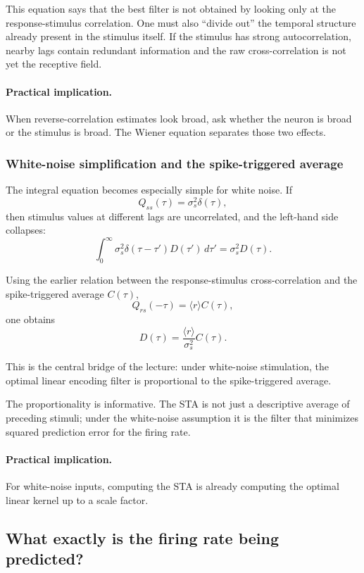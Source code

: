 This equation says that the best filter is not obtained by looking only at the response-stimulus correlation. One must also ``divide out'' the temporal structure already present in the stimulus itself. If the stimulus has strong autocorrelation, nearby lags contain redundant information and the raw cross-correlation is not yet the receptive field.

\paragraph{Practical implication.}
When reverse-correlation estimates look broad, ask whether the neuron is broad or the stimulus is broad. The Wiener equation separates those two effects.

\subsubsection{White-noise simplification and the spike-triggered average}

The integral equation becomes especially simple for white noise. If
\[
Q_{ss}(\tau)=\sigma_s^2\delta(\tau),
\]
then stimulus values at different lags are uncorrelated, and the left-hand side collapses:
\[
\int_0^{\infty} \sigma_s^2\delta(\tau-\tau')D(\tau')\,d\tau' = \sigma_s^2 D(\tau).
\]

Using the earlier relation between the response-stimulus cross-correlation and the spike-triggered average $C(\tau)$,
\[
Q_{rs}(-\tau)=\langle r\rangle C(\tau),
\]
one obtains
\[
D(\tau)=\frac{\langle r\rangle}{\sigma_s^2}C(\tau).
\]

This is the central bridge of the lecture: under white-noise stimulation, the optimal linear encoding filter is proportional to the spike-triggered average.

The proportionality is informative. The STA is not just a descriptive average of preceding stimuli; under the white-noise assumption it is the filter that minimizes squared prediction error for the firing rate.

\paragraph{Practical implication.}
For white-noise inputs, computing the STA is already computing the optimal linear kernel up to a scale factor.

\subsection{What exactly is the firing rate being predicted?}


